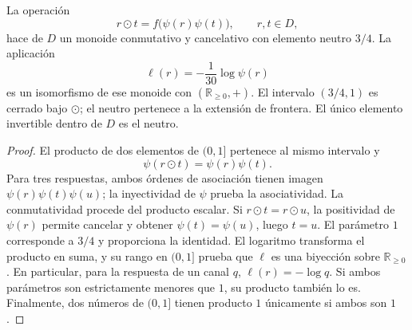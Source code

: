 \begin{proposition}
\label{cr28:comp-monoid}
La operación
\begin{equation}
 r\odot t=f\bigl(\psi(r)\psi(t)\bigr),\qquad r,t\in D,
 \label{cr28:comp-law}
\end{equation}
hace de $D$ un monoide conmutativo y cancelativo con elemento neutro $3/4$.
La aplicación
\begin{equation}
 \ell(r)=-\frac1{30}\log\psi(r)
 \label{cr28:comp-character}
\end{equation}
es un isomorfismo de ese monoide con $(\mathbb R_{\geq0},+)$.
El intervalo $(3/4,1)$ es cerrado bajo $\odot$; el neutro pertenece a
la extensión de frontera. El único elemento invertible dentro de $D$
es el neutro.
\end{proposition}
\begin{proof}
El producto de dos elementos de $(0,1]$ pertenece al mismo intervalo y
\[
 \psi(r\odot t)=\psi(r)\psi(t).
\]
Para tres respuestas, ambos órdenes de asociación tienen imagen
$\psi(r)\psi(t)\psi(u)$; la inyectividad de $\psi$ prueba la
asociatividad. La conmutatividad procede del producto escalar. Si
$r\odot t=r\odot u$, la positividad de $\psi(r)$ permite cancelar y
obtener $\psi(t)=\psi(u)$, luego $t=u$. El parámetro $1$ corresponde a
$3/4$ y proporciona la identidad. El logaritmo transforma el producto en
suma, y su rango en $(0,1]$ prueba que $\ell$ es una biyección sobre
$\mathbb R_{\geq0}$. En particular, para la respuesta de un canal $q$,
$\ell(r)=-\log q$. Si ambos parámetros son estrictamente menores que
$1$, su producto también lo es. Finalmente, dos números de $(0,1]$
tienen producto $1$ únicamente si ambos son $1$.
\end{proof}

